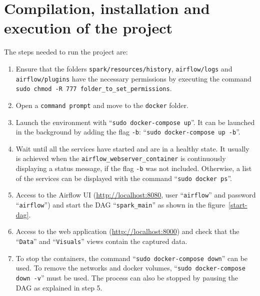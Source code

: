 \section{Compilation, installation and execution of the project} \label{programmer_execute}
\nonzeroparskip The steps needed to run the project are:
\begin{enumerate}
	\item Ensure that the folders \texttt{spark/resources/history}, \texttt{airflow/logs} and \texttt{airflow/plugins} have the necessary permissions by executing the command \texttt{sudo chmod -R 777 folder\_to\_set\_permissions}. 
	\item Open a \texttt{command prompt} and move to the \texttt{docker} folder.
	\item Launch the environment with ``\texttt{sudo docker-compose up}''. It can be launched in the background by adding the flag \texttt{-b}: ``\texttt{sudo docker-compose up -b}''.
	\item Wait until all the services have started and are in a healthy state. It usually is achieved when the \texttt{airflow\_webserver\_container} is continuously displaying a status message, if the flag \texttt{-b} was not included. Otherwise, a list of the services can be displayed with the command ``\texttt{sudo docker ps}''.
	\item Access to the Airflow UI (\url{http://localhost:8080}, user ``\texttt{airflow}'' and password ``\texttt{airflow}'') and start the DAG ``\texttt{spark\_main}'' as shown in the figure~\ref{start-dag}.
	\item Access to the web application (\url{http://localhost:8000}) and check that the ``\texttt{Data}'' and ``\texttt{Visuals}'' views contain the captured data.
	\item To stop the containers, the command ``\texttt{sudo docker-compose down}'' can be used. To remove the networks and docker volumes, ``\texttt{sudo docker-compose down -v}'' must be used. The process can also be stopped by pausing the DAG as explained in step 5.
\end{enumerate}


